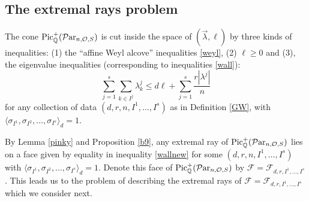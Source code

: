\documentclass[11pt]{amsart}
\newcommand\mf{\mathcal{F}}
\newcommand\Pic{\operatorname{Pic}}
\newcommand\Par{\mathcal{P}\text{ar} }
\numberwithin{theorem}{subsection}
\begin{document}
\subsection{The extremal rays problem}
The cone  $\Pic^+_{\Bbb{Q}}(\Par_{n,\mathcal{O},S})$ is cut inside the space of $(\vec{\lambda},\ell)$ by three kinds of inequalities: (1) the ``affine Weyl alcove''  inequalities \eqref{weyl}, (2)
$\ell\geq 0$ and (3), the eigenvalue inequalities (corresponding to inequalities \eqref{wall}):
\begin{equation}\label{wallnew}
\sum_{j=1}^s\sum_{k\in I^j} \lambda^j_k\leq d\ell +\sum_{j=1}^s \frac{r|\lambda^j|}{n}
\end{equation}
for any collection of data
$(d,r,n,I^1,\dots,I^s)$ as in Definition \ref{GW}, with $\langle\sigma_{I^1}, \sigma_{I^2},\dots,\sigma_{I^s}\rangle_d= 1$.

By Lemma  \ref{pinky} and Proposition \ref{b9}, any extremal ray of $\Pic^+_{\Bbb{Q}}(\Par_{n,\mathcal{O},S})$ lies on a face given by equality in inequality
\eqref{wallnew}  for some $(d,r,n,I^1,\dots,I^s)$ with $\langle\sigma_{I^1}, \sigma_{I^2},\dots,\sigma_{I^s}\rangle_d= 1$. Denote this face of $\Pic^+_{\Bbb{Q}}(\Par_{n,\mathcal{O},S})$ by $\mf=\mf_{d,r,I^1,\dots,I^s}$. This leads us to the problem of describing  the extremal rays of  $\mf=\mf_{d,r,I^1,\dots,I^s}$ which we consider next.
\end{document}
